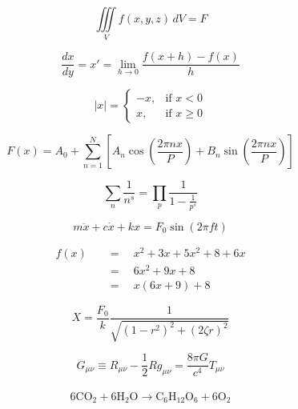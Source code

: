 \documentclass{article}
\begin{document}
    \thispagestyle{empty}
    \begin{equation*}                                           %
    \iiint\limits_V f(x,y,z)\,dV = F
    \end{equation*}                                             %

    \begin{equation*}
    \frac{dx}{dy}=x'=\lim_{h \to 0}\frac{f(x+h)-f(x)}{h}
    \end{equation*}

    \begin{equation*}
    |x|=\begin{cases}
    -x, & \text{if $x < 0$}\\
    x, & \text{if $x \geq 0$} 
    \end{cases}
    \end{equation*}

    \begin{equation*}
    F(x)= A_0 + \sum_{n=1}^N\left[ A_n\cos{\left(\frac{2\pi nx}{P}\right)}+B_n\sin{\left(\frac{2\pi nx}{P}\right)}\right]
    \end{equation*}

    \begin{equation*}
    \sum_n \frac{1}{n^s}=\prod_p \frac{1}{1-\frac{1}{p^s}}
    \end{equation*}

    \begin{equation*}         %
    m\ddot{x}+c\dot{x}+kx=F_0\sin(2\pi ft)
    \end{equation*}

    \begin{align*}
    f(x)\quad &=\quad x^2 + 3x + 5x^2 +8 +6x\\
    &=\quad 6x^2 +9x +8\\
    &=\quad x(6x+9)+8
    \end{align*}

    $$
    X=\frac{F_0}{k}\frac{1}{\sqrt{(1-r^2)^2+(2\zeta r)^2}}
    $$

    \begin{equation*}
    G_{\mu\nu} \equiv R_{\mu\nu}-\frac{1}{2}Rg_{\mu\nu}=\frac{8\pi G}{c^4}T_{\mu\nu}
    \end{equation*}\\
    \vspace{-3mm}
    $$\mathrm{6CO_2+6H_2O \to C_6H_{12}O_6+6O_2}$$
\end{document}
